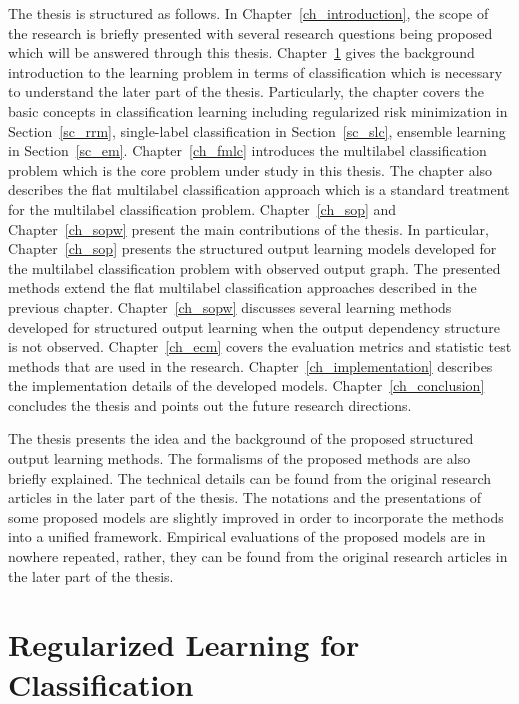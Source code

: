 The thesis is structured as follows.
In Chapter~\ref{ch_introduction}, the scope of the research is briefly presented with several research questions being proposed which will be answered through this thesis.
Chapter~\ref{ch_rlc} gives the background introduction to the learning problem in terms of classification which is necessary to understand the later part of the thesis.
Particularly, the chapter covers the basic concepts in classification learning including regularized risk minimization in Section~\ref{sc_rrm}, single-label classification in Section~\ref{sc_slc}, ensemble learning in Section~\ref{sc_em}.
Chapter~\ref{ch_fmlc} introduces the multilabel classification problem which is the core problem under study in this thesis.
The chapter also describes the flat multilabel classification approach which is a standard treatment for the multilabel classification problem.
Chapter~\ref{ch_sop} and Chapter~\ref{ch_sopw} present the main contributions of the thesis.
In particular, Chapter~\ref{ch_sop} presents the structured output learning models developed for the multilabel classification problem with observed output graph.
The presented methods extend the flat multilabel classification approaches described in the previous chapter.
Chapter~\ref{ch_sopw} discusses several learning methods developed for structured output learning when the output dependency structure is not observed.
Chapter~\ref{ch_ecm} covers the evaluation metrics and statistic test methods that are used in the research.
Chapter~\ref{ch_implementation} describes the implementation details of the developed models.
Chapter~\ref{ch_conclusion} concludes the thesis and points out the future research directions.

The thesis presents the idea and the background of the proposed structured output learning methods.
The formalisms of the proposed methods are also briefly explained.
The technical details can be found from the original research articles in the later part of the thesis.
The notations and the presentations of some proposed models are slightly improved in order to incorporate the methods into a unified framework.
Empirical evaluations of the proposed models are in nowhere repeated, rather, they can be found from the original research articles in the later part of the thesis.



%
%
%
\chapter{Regularized Learning for Classification} \label{ch_rlc}



